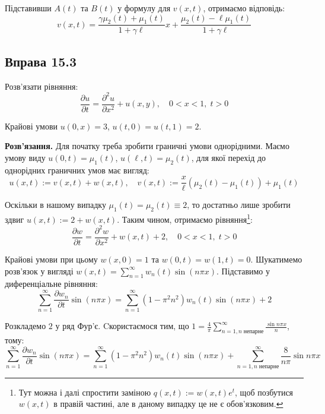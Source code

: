 \documentclass{hw_template}
\begin{document}
Підставивши $A(t)$ та $B(t)$ у формулу для $v(x,t)$, отримаємо відповідь:
\begin{equation*}
    v(x,t) = \frac{\gamma \mu_2(t) + \mu_1(t)}{1+\gamma \ell}x + \frac{\mu_2(t)-\ell \mu_1(t)}{1+\gamma \ell}
\end{equation*}

\subsection{Вправа 15.3}

\begin{problem}
    Розв'язати рівняння:
    \begin{equation*}
        \frac{\partial u}{\partial t} = \frac{\partial^2 u}{\partial x^2} + u(x,y), \quad 0 < x < 1,\; t > 0
    \end{equation*}

    Крайові умови $u(0,x)=3$, $u(t,0)=u(t,1)=2$.
\end{problem}

\textbf{Розв'язання.} Для початку треба зробити граничні умови однорідними. 
Маємо умову виду $u(0,t) = \mu_1(t)$, $u(\ell, t) = \mu_2(t)$, для якої 
перехід до однорідних граничних умов має вигляд:
\begin{equation*}
    u(x,t) := v(x,t) + w(x,t), \quad v(x,t) := \frac{x}{\ell}(\mu_2(t)-\mu_1(t)) + \mu_1(t)
\end{equation*}

Оскільки в нашому випадку $\mu_1(t)=\mu_2(t) \equiv 2$, то достатньо лише зробити 
здвиг $u(x,t) := 2 + w(x,t)$. Таким чином, отримаємо рівняння\footnote{Тут можна 
і далі спростити заміною $q(x,t) := w(x,t)e^t$, щоб позбутися $w(x,t)$ в правій частині, але 
в даному випадку це не є обов'язковим.}:
\begin{equation*}
    \frac{\partial w}{\partial t} = \frac{\partial^2 w}{\partial x^2} + w(x,t) + 2, \quad 0 < x < 1,\; t > 0
\end{equation*}

Крайові умови при цьому $w(x,0)=1$ та $w(0,t)=w(1,t)=0$. Шукатимемо розв'язок 
у вигляді $w(x,t) = \sum_{n=1}^{\infty}w_n(t)\sin(n\pi x)$. Підставимо у диференціальне рівняння:
\begin{equation*}
    \sum_{n=1}^{\infty}\frac{\partial w_n}{\partial t}\sin(n\pi x) = \sum_{n=1}^{\infty}(1-\pi^2 n^2)w_n(t)\sin(n\pi x) + 2
\end{equation*}

Розкладемо $2$ у ряд Фур'є. Cкористаємося тим, що $1 = \frac{4}{\pi}\sum_{n=1,n \; \text{непарне}}^{\infty}\frac{\sin n \pi x}{n}$, тому:
\begin{equation*}
    \sum_{n=1}^{\infty}\frac{\partial w_n}{\partial t}\sin(n\pi x) = \sum_{n=1}^{\infty}(1-\pi^2 n^2)w_n(t)\sin(n\pi x) + \sum_{n=1, n \; \text{непарне}}^{\infty}\frac{8}{n\pi}\sin n\pi x
\end{equation*} 
\end{document}
